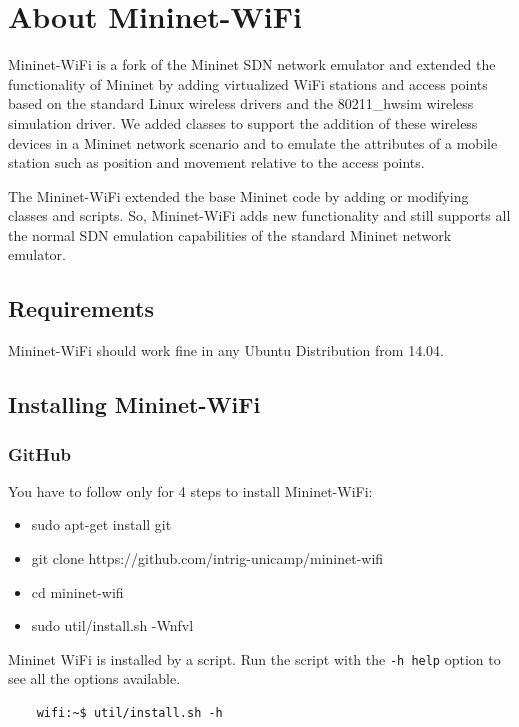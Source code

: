 \chapter{About Mininet-WiFi}

Mininet-WiFi is a fork of the Mininet SDN network emulator and extended the functionality of Mininet by adding virtualized WiFi stations and access points based on the standard Linux wireless drivers and the 80211\_hwsim wireless simulation driver. We added classes to support the addition of these wireless devices in a Mininet network scenario and to emulate the attributes of a mobile station such as position and movement relative to the access points.

The Mininet-WiFi extended the base Mininet code by adding or modifying classes and scripts. So, Mininet-WiFi adds new functionality and still supports all the normal SDN emulation capabilities of the standard Mininet network emulator.


\section{Requirements}

Mininet-WiFi should work fine in any Ubuntu Distribution from 14.04.

\section{Installing Mininet-WiFi}

\subsection{GitHub}
You have to follow only for 4 steps to install Mininet-WiFi:

\begin{itemize}
\item sudo apt-get install git
\item git clone https://github.com/intrig-unicamp/mininet-wifi
\item cd mininet-wifi
\item sudo util/install.sh -Wnfvl\\
\end{itemize}

Mininet WiFi is installed by a script. Run the script with the \texttt{-h help} option to see all the options available.

\begin{verbatim}
    wifi:~$ util/install.sh -h
\end{verbatim}

